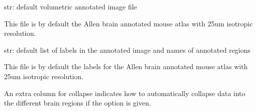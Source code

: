 \documentclass[letterpaper,10pt,english]{sphinxmanual}
\begin{document}
\begin{fulllineitems}
\label{api/ClearMap.Analysis:ClearMap.Analysis.Label.DefaultLabeledImageFile}
str: default volumetric annotated image file

This file is by default the Allen brain annotated mouse atlas with 25um
isotropic resolution.

\end{fulllineitems}


\begin{fulllineitems}
\label{api/ClearMap.Analysis:ClearMap.Analysis.Label.DefaultAnnotationFile}
str: default list of labels in the annotated image and names of annotated regions

This file is by default the labels for the Allen brain annotated mouse
atlas with 25um isotropic resolution.

An extra column for collapse indicates how to automatically collapse data into
the different brain regions if the  option is given.

\end{fulllineitems}

\end{document}
